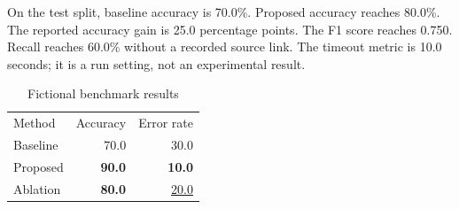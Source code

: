 \documentclass{article}
\begin{document}
On the test split, baseline accuracy is 70.0\%.
Proposed accuracy reaches 80.0\%.
The reported accuracy gain is 25.0 percentage points.
The F1 score reaches 0.750.
Recall reaches 60.0\% without a recorded source link.
The timeout metric is 10.0 seconds; it is a run setting, not an experimental result.

\begin{table}
\caption{Fictional benchmark results}
\label{tab:showcase}
\begin{tabular}{lrr}
Method & Accuracy & Error rate \\
Baseline & 70.0 & 30.0 \\
Proposed & \textbf{90.0} & \textbf{10.0} \\
Ablation & \textbf{80.0} & \underline{20.0} \\
\end{tabular}
\end{table}
\end{document}

